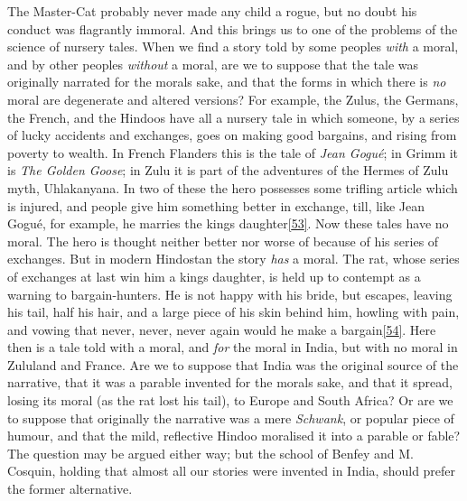 \documentclass[14pt,a4paper]{memoir}
\begin{document}
The Master-Cat probably never made any child a rogue, but no doubt his
conduct was flagrantly immoral. And this brings us to one of the
problems of the science of nursery tales. When we find a story told by
some peoples \emph{with} a moral, and by other peoples \emph{without} a
moral, are we to suppose that the tale was originally narrated for the
moral\textquotesingle s sake, and that the forms in which there is
\emph{no} moral are degenerate and altered versions? For example, the
Zulus, the Germans, the French, and the Hindoos have all a nursery tale
in which someone, by a series of lucky accidents and exchanges, goes on
making good bargains, and rising from poverty to wealth. In French
Flanders this is the tale of \emph{Jean Gogué}; in Grimm it is \emph{The
Golden Goose}; in Zulu it is part of the adventures of the Hermes of
Zulu myth, Uhlakanyana. In two of these the hero possesses some trifling
article which is injured, and people give him something better in
exchange, till, like Jean Gogué, for example, he marries the
king\textquotesingle s
daughter\protect\hypertarget{4533318093929944247_33931-h-0.htm.xhtmlux5cux23FNanchor_53}{}{}\protect\hyperlink{4533318093929944247_33931-h-1.htm.xhtmlux5cux23Footnote_53}{{[}53{]}}.
Now these tales have no moral. The hero is thought neither better nor
worse of because of his series of exchanges. But in modern Hindostan the
story \emph{has} a moral. The rat, whose series of exchanges at last win
him a king\textquotesingle s daughter, is held up to contempt as a
warning to bargain-hunters. He is not happy with his bride, but escapes,
leaving his tail, half his hair, and a large piece of his skin behind
him, howling with pain, and vowing that \textquotesingle never, never,
never again would he make a
bargain\protect\hypertarget{4533318093929944247_33931-h-0.htm.xhtmlux5cux23FNanchor_54}{}{}\protect\hyperlink{4533318093929944247_33931-h-1.htm.xhtmlux5cux23Footnote_54}{{[}54{]}}.\textquotesingle{}
Here then is a tale told with a moral, and \emph{for} the moral in
India, but with no moral in Zululand and France. Are we to suppose that
India was the original source of the narrative, that it was a parable
invented for the moral\textquotesingle s sake, and that it spread,
losing its moral (as the rat lost his tail), to Europe and South Africa?
Or are we to suppose that originally the narrative was a mere
\emph{Schwank}, or popular piece of humour, and that the mild,
reflective Hindoo moralised it into a parable or fable? The question may
be argued either way; but the school of Benfey and M. Cosquin, holding
that almost all our stories were invented in India, should prefer the
former alternative.
\end{document}
